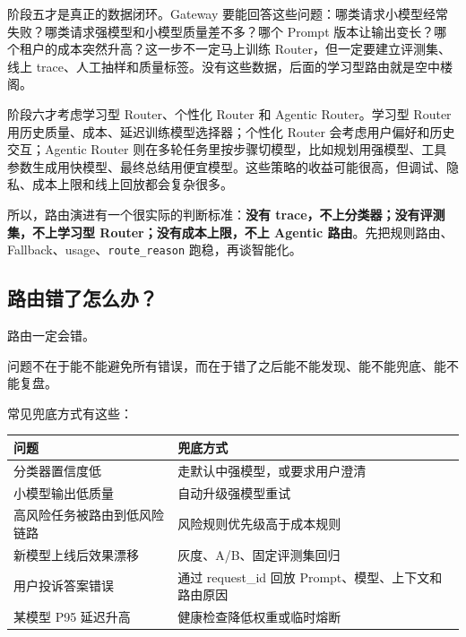 \documentclass[9pt,a4paper,twocolumn]{ctexart}
\begin{document}
阶段五才是真正的数据闭环。Gateway 要能回答这些问题：哪类请求小模型经常失败？哪类请求强模型和小模型质量差不多？哪个 Prompt 版本让输出变长？哪个租户的成本突然升高？这一步不一定马上训练 Router，但一定要建立评测集、线上 trace、人工抽样和质量标签。没有这些数据，后面的学习型路由就是空中楼阁。



阶段六才考虑学习型 Router、个性化 Router 和 Agentic Router。学习型 Router 用历史质量、成本、延迟训练模型选择器；个性化 Router 会考虑用户偏好和历史交互；Agentic Router 则在多轮任务里按步骤切模型，比如规划用强模型、工具参数生成用快模型、最终总结用便宜模型。这些策略的收益可能很高，但调试、隐私、成本上限和线上回放都会复杂很多。



所以，路由演进有一个很实际的判断标准：\textbf{没有 trace，不上分类器；没有评测集，不上学习型 Router；没有成本上限，不上 Agentic 路由}。先把规则路由、Fallback、usage、\texttt{route\_reason} 跑稳，再谈智能化。



\subsection*{路由错了怎么办？}


路由一定会错。



问题不在于能不能避免所有错误，而在于错了之后能不能发现、能不能兜底、能不能复盘。



常见兜底方式有这些：


{\footnotesize
\begin{tabular}{|p{}|p{}|}
\hline
\textbf{问题} & \textbf{兜底方式} \\
\hline
分类器置信度低 & 走默认中强模型，或要求用户澄清 \\
\hline
小模型输出低质量 & 自动升级强模型重试 \\
\hline
高风险任务被路由到低风险链路 & 风险规则优先级高于成本规则 \\
\hline
新模型上线后效果漂移 & 灰度、A/B、固定评测集回归 \\
\hline
用户投诉答案错误 & 通过 request\_id 回放 Prompt、模型、上下文和路由原因 \\
\hline
某模型 P95 延迟升高 & 健康检查降低权重或临时熔断 \\
\hline
\end{tabular}
}
\end{document}
